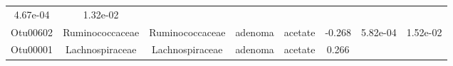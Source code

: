 \documentclass[11pt,]{article}
\begin{document}
\begin{longtable}[]{@{}cccccccc@{}}
\begin{minipage}[t]{0.08\columnwidth}
4.67e-04\strut
\end{minipage} & \begin{minipage}[t]{0.08\columnwidth}\centering\strut
1.32e-02\strut
\end{minipage}\tabularnewline
\begin{minipage}[t]{0.08\columnwidth}\centering\strut
Otu00602\strut
\end{minipage} & \begin{minipage}[t]{0.15\columnwidth}\centering\strut
Ruminococcaceae\strut
\end{minipage} & \begin{minipage}[t]{0.15\columnwidth}\centering\strut
Ruminococcaceae\strut
\end{minipage} & \begin{minipage}[t]{0.08\columnwidth}\centering\strut
adenoma\strut
\end{minipage} & \begin{minipage}[t]{0.09\columnwidth}\centering\strut
acetate\strut
\end{minipage} & \begin{minipage}[t]{0.07\columnwidth}\centering\strut
-0.268\strut
\end{minipage} & \begin{minipage}[t]{0.08\columnwidth}\centering\strut
5.82e-04\strut
\end{minipage} & \begin{minipage}[t]{0.08\columnwidth}\centering\strut
1.52e-02\strut
\end{minipage}\tabularnewline
\begin{minipage}[t]{0.08\columnwidth}\centering\strut
Otu00001\strut
\end{minipage} & \begin{minipage}[t]{0.15\columnwidth}\centering\strut
Lachnospiraceae\strut
\end{minipage} & \begin{minipage}[t]{0.15\columnwidth}\centering\strut
Lachnospiraceae\strut
\end{minipage} & \begin{minipage}[t]{0.08\columnwidth}\centering\strut
adenoma\strut
\end{minipage} & \begin{minipage}[t]{0.09\columnwidth}\centering\strut
acetate\strut
\end{minipage} & \begin{minipage}[t]{0.07\columnwidth}\centering\strut
0.266\strut
\end{minipage} & \begin{minipage}[t]{0.08\columnwidth}\centering\strut

\end{minipage}
\end{longtable}
\end{document}
